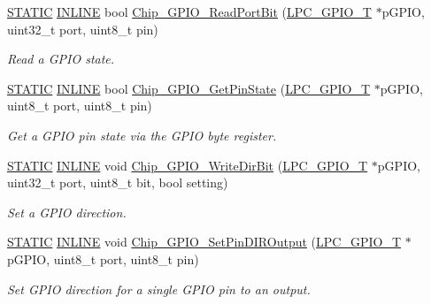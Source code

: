 \begin{DoxyCompactItemize}
\hyperlink{group___l_p_c___types___public___macros_ga10b2d890d871e1489bb02b7e70d9bdfb}{S\+T\+A\+T\+IC} \hyperlink{spifi__18xx__43xx_8h_a2eb6f9e0395b47b8d5e3eeae4fe0c116}{I\+N\+L\+I\+NE} bool \hyperlink{group___g_p_i_o__18_x_x__43_x_x_ga74ca55b747c3a51c1ae3e47645da0c75}{Chip\+\_\+\+G\+P\+I\+O\+\_\+\+Read\+Port\+Bit} (\hyperlink{struct_l_p_c___g_p_i_o___t}{L\+P\+C\+\_\+\+G\+P\+I\+O\+\_\+T} $\ast$p\+G\+P\+IO, uint32\+\_\+t port, uint8\+\_\+t pin)
\begin{DoxyCompactList}\small\item\em Read a G\+P\+IO state. \end{DoxyCompactList}\item 
\hyperlink{group___l_p_c___types___public___macros_ga10b2d890d871e1489bb02b7e70d9bdfb}{S\+T\+A\+T\+IC} \hyperlink{spifi__18xx__43xx_8h_a2eb6f9e0395b47b8d5e3eeae4fe0c116}{I\+N\+L\+I\+NE} bool \hyperlink{group___g_p_i_o__18_x_x__43_x_x_ga9f0e35190f01c706564a88f1f88cf716}{Chip\+\_\+\+G\+P\+I\+O\+\_\+\+Get\+Pin\+State} (\hyperlink{struct_l_p_c___g_p_i_o___t}{L\+P\+C\+\_\+\+G\+P\+I\+O\+\_\+T} $\ast$p\+G\+P\+IO, uint8\+\_\+t port, uint8\+\_\+t pin)
\begin{DoxyCompactList}\small\item\em Get a G\+P\+IO pin state via the G\+P\+IO byte register. \end{DoxyCompactList}\item 
\hyperlink{group___l_p_c___types___public___macros_ga10b2d890d871e1489bb02b7e70d9bdfb}{S\+T\+A\+T\+IC} \hyperlink{spifi__18xx__43xx_8h_a2eb6f9e0395b47b8d5e3eeae4fe0c116}{I\+N\+L\+I\+NE} void \hyperlink{group___g_p_i_o__18_x_x__43_x_x_ga21ebb6a7bcdb311acecafaf055c967a5}{Chip\+\_\+\+G\+P\+I\+O\+\_\+\+Write\+Dir\+Bit} (\hyperlink{struct_l_p_c___g_p_i_o___t}{L\+P\+C\+\_\+\+G\+P\+I\+O\+\_\+T} $\ast$p\+G\+P\+IO, uint32\+\_\+t port, uint8\+\_\+t bit, bool setting)
\begin{DoxyCompactList}\small\item\em Set a G\+P\+IO direction. \end{DoxyCompactList}\item 
\hyperlink{group___l_p_c___types___public___macros_ga10b2d890d871e1489bb02b7e70d9bdfb}{S\+T\+A\+T\+IC} \hyperlink{spifi__18xx__43xx_8h_a2eb6f9e0395b47b8d5e3eeae4fe0c116}{I\+N\+L\+I\+NE} void \hyperlink{group___g_p_i_o__18_x_x__43_x_x_gadd0450341df62f7e13ee57cd249fe2a2}{Chip\+\_\+\+G\+P\+I\+O\+\_\+\+Set\+Pin\+D\+I\+R\+Output} (\hyperlink{struct_l_p_c___g_p_i_o___t}{L\+P\+C\+\_\+\+G\+P\+I\+O\+\_\+T} $\ast$p\+G\+P\+IO, uint8\+\_\+t port, uint8\+\_\+t pin)
\begin{DoxyCompactList}\small\item\em Set G\+P\+IO direction for a single G\+P\+IO pin to an output. \end{DoxyCompactList}\item 

\end{DoxyCompactItemize}

